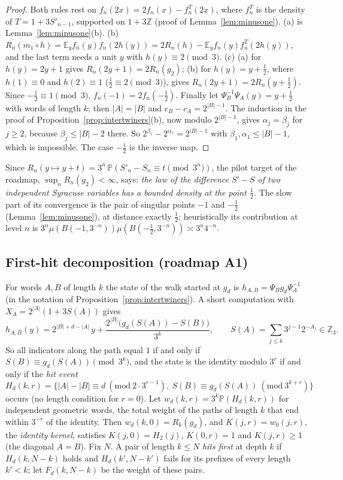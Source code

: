 \documentclass[11pt]{article}
\theoremstyle{remark}
\newcommand{\Z}{\mathbb Z}
\newcommand{\E}{\mathbb E}
\newcommand{\Prob}{\mathbb P}
\begin{document}
\begin{proof}
Both rules rest on $f_n(2x)=2f_n(x)-f^T_n(2x)$, where $f^T_n$ is the density of $T=1+3S'_{n-1}$, supported on $1+3\Z$ (proof of Lemma~\ref{lem:minusone}). (a) is Lemma~\ref{lem:minusone}(b). (b) $R_n(m_1\circ h)=\E_yf_n(y)f_n(2h(y))=2R_n(h)-\E_yf_n(y)f^T_n(2h(y))$, and the last term needs a unit $y$ with $h(y)\equiv2\pmod3$. (c) (a) for $h(y)=2y+1$ gives $R_n(2y+1)=2R_n(g_2)$; (b) for $h(y)=y+\frac12$, where $h(1)\equiv0$ and $h(2)\equiv1$ ($\frac12\equiv2\pmod3$), gives $R_n(2y+1)=2R_n(y+\frac12)$. Since $-\frac12\equiv1\pmod3$, $f_n(-1)=2f_n(-\frac12)$. Finally let $\Psi_B^{-1}\Psi_A(y)=y+\frac12$ with words of length $k$; then $|A|=|B|$ and $c_B-c_A=2^{|B|-1}$. The induction in the proof of Proposition~\ref{prop:intertwiners}(b), now modulo $2^{|B|-1}$, gives $\alpha_j=\beta_j$ for $j\ge2$, because $\beta_j\le|B|-2$ there. So $2^{\beta_1}-2^{\alpha_1}=2^{|B|-1}$ with $\beta_1,\alpha_1\le|B|-1$, which is impossible. The case $-\frac12$ is the inverse map.
\end{proof}

Since $R_n(y\mapsto y+t)=3^n\,\Prob(S'_n-S_n\equiv t\pmod{3^n})$, the pilot target of the roadmap, $\sup_nR_n(g_2)<\infty$, says: \emph{the law of the difference $S'-S$ of two independent Syracuse variables has a bounded density at the point $\frac12$.} The slow part of its convergence is the pair of singular points $-1$ and $-\frac12$ (Lemma~\ref{lem:minusone}), at distance exactly $\frac12$; heuristically its contribution at level $n$ is $3^n\mu(B(-1,3^{-n}))\mu(B(-\frac12,3^{-n}))\asymp3^n4^{-n}$.

\subsection*{First-hit decomposition (roadmap A1)}
For words $A,B$ of length $k$ the state of the walk started at $g_d$ is $h_{A,B}=\Psi_Bg_d\Psi_A^{-1}$ (in the notation of Proposition~\ref{prop:intertwiners}). A short computation with $X_A=2^{|A|}(1+3S(A))$ gives
\begin{equation}\label{eq:state}
 h_{A,B}(y)=2^{|B|+d-|A|}\,y+\frac{2^{|B|}\bigl(g_d(S(A))-S(B)\bigr)}{3^k},\qquad S(A)=\sum_{j\le k}3^{j-1}2^{-A_j}\in\Z_3 .
\end{equation}
So all indicators along the path equal $1$ if and only if $S(B)\equiv g_d(S(A))\pmod{3^k}$, and the state is the identity modulo $3^r$ if and only if the \emph{hit event}
\[
 H_d(k,r)=\bigl\{|A|-|B|\equiv d\ (\mathrm{mod}\ 2\cdot3^{r-1}),\ S(B)\equiv g_d(S(A))\ (\mathrm{mod}\ 3^{k+r})\bigr\}
\]
occurs (no length condition for $r=0$). Let $w_d(k,r)=3^k\Prob(H_d(k,r))$ for independent geometric words, the total weight of the paths of length $k$ that end within $3^{-r}$ of the identity. Then $w_d(k,0)=R_k(g_d)$, and $K(j,r)=w_0(j,r)$, the \emph{identity kernel}, satisfies $K(j,0)=H_2(j)$, $K(0,r)=1$ and $K(j,r)\ge1$ (the diagonal $A=B$). Fix $N$. A pair of length $k\le N$ \emph{hits first} at depth $k$ if $H_d(k,N-k)$ holds and $H_d(k',N-k')$ fails for its prefixes of every length $k'<k$; let $F_d(k,N-k)$ be the weight of these pairs.
\end{document}
